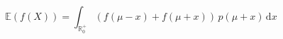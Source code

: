 \documentclass[preview]{standalone}
\begin{document}
\begin{equation}
\tag{20:rhs_final}
    \mathbb{E} ( f ( X ) ) = \int_{\mathbb{R}^+_0} ( f ( \mu - x ) + f ( \mu + x ) ) \, p ( \mu + x ) \, \mathrm{d}x
\end{equation}
\end{document}
